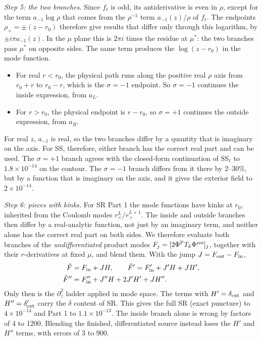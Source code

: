 \documentclass[aps,prd,twocolumn,superscriptaddress,nofootinbib,floatfix]{revtex4-2}
\newcommand{\dext}{\delta_{\rm ext}}
\newcommand{\PhiP}{\Phi^{\rm P}}
\newcommand{\Pres}{\Phi^{\rm res}}
\begin{document}
\emph{Step 5: the two branches.}
Since $f_\ell$ is odd, its antiderivative is even in $\rho$, except for the term $a_{-1}\log\rho$ that comes from the $\rho^{-1}$ term $a_{-1}(z)/\rho$ of $f_\ell$.
The endpoints $\rho_+=\pm(z-r_0)$ therefore give results that differ only through this logarithm, by $\pm i\pi a_{-1}(z)$.
In the $\mu$ plane this is $2\pi i$ times the residue at $\mu^*$: the two branches pass $\mu^*$ on opposite sides.
The same term produces the $\log(z-r_0)$ in the mode function.
\begin{itemize}
\item For real $r<r_0$, the physical path runs along the positive real $\rho$ axis from $r_0+r$ to $r_0-r$, which is the $\sigma=-1$ endpoint. So $\sigma=-1$ continues the inside expression, from $a_L$.
\item For $r>r_0$, the physical endpoint is $r-r_0$, so $\sigma=+1$ continues the outside expression, from $a_R$.
\end{itemize}
For real $z$, $a_{-1}$ is real, so the two branches differ by a quantity that is imaginary on the axis.
For SS, therefore, either branch has the correct real part and can be used.
The $\sigma=+1$ branch agrees with the closed-form continuation of $\mathrm{SS}_\ell$ to $1.8\times10^{-14}$ on the contour.
The $\sigma=-1$ branch differs from it there by 2--30\%, but by a function that is imaginary on the axis, and it gives the exterior field to $2\times10^{-14}$.

\emph{Step 6: pieces with kinks.}
For SR Part 1 the mode functions have kinks at $r_0$, inherited from the Coulomb modes $r_<^L/r_>^{L+1}$.
The inside and outside branches then differ by a real-analytic function, not just by an imaginary term, and neither alone has the correct real part on both sides.
We therefore evaluate both branches of the \emph{undifferentiated} product modes $F_j=[2\PhiP T_k\Pres]_j$, together with their $r$-derivatives at fixed $\mu$, and blend them.
With the jump $J=F_{\rm out}-F_{\rm in}$,
\begin{align}
\tilde F&=F_{\rm in}+JH,\qquad
\tilde F'=F'_{\rm in}+J'H+JH',\nonumber\\
\tilde F''&=F''_{\rm in}+J''H+2J'H'+JH''.
\end{align}
Only then is the $\partial_z^2$ ladder applied in mode space.
The terms with $H'=\dext$ and $H''=\dext'$ carry the $\delta$ content of SR.
This gives the full SR (exact puncture) to $4\times10^{-14}$ and Part 1 to $1.1\times10^{-13}$.
The inside branch alone is wrong by factors of 4 to 1200.
Blending the finished, differentiated source instead loses the $H'$ and $H''$ terms, with errors of 3 to 900.
\end{document}
